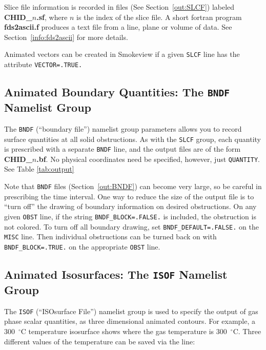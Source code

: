 \documentclass[11pt]{book}
\newcommand{\ct}{\tt\small}
\begin{document}
Slice file information is recorded in files (See Section~\ref{out:SLCF}) 
labeled {\bf CHID\_$n$.sf}, where $n$ is the index of the slice file.
A short fortran program {\bf fds2ascii.f} produces a text file from a line,
plane or volume of data. See Section~\ref{info:fds2ascii} for more details.

Animated vectors can be created in Smokeview if a given {\ct SLCF} line has the attribute {\ct VECTOR=.TRUE.}




\subsection{Animated Boundary Quantities: The \texorpdfstring{{\tt BNDF}}{BNDF} Namelist Group}
\label{info:BNDF}

The {\ct BNDF} (``boundary file'') 
 namelist group parameters allows you
to record surface quantities at all solid obstructions. As with
the {\ct SLCF} group, each quantity is prescribed with a separate
{\ct BNDF} line, and the output files are of the form {\bf CHID\_$n$.bf}.
No physical coordinates need be specified, however, just {\ct QUANTITY}.
See Table \ref{tab:output}

Note that {\ct BNDF} files (Section~\ref{out:BNDF}) can become very
large, so be careful in prescribing the time interval.
One way to reduce the size of the output file is to ``turn off'' the
drawing of boundary information on desired obstructions. On any given
{\ct OBST} line, if the string {\ct BNDF\_BLOCK=.FALSE.} is included,
the obstruction is not colored. To turn off all boundary drawing,
set {\ct BNDF\_DEFAULT=.FALSE.} on the {\ct MISC} line. Then individual
obstructions can be turned back on with {\ct BNDF\_BLOCK=.TRUE.} on
the appropriate {\ct OBST} line.



\subsection{Animated Isosurfaces: The \texorpdfstring{{\tt ISOF}}{ISOF} Namelist Group}
\label{info:ISOF} 

The {\ct ISOF} (``ISOsurface File'') namelist group is used to specify the output of
gas phase scalar quantities, as three dimensional animated contours.
For example, a 300~$^\circ$C temperature isosurface shows where the gas temperature is
300~$^\circ$C.
Three different values of the temperature can be saved via the line:
\end{document}
